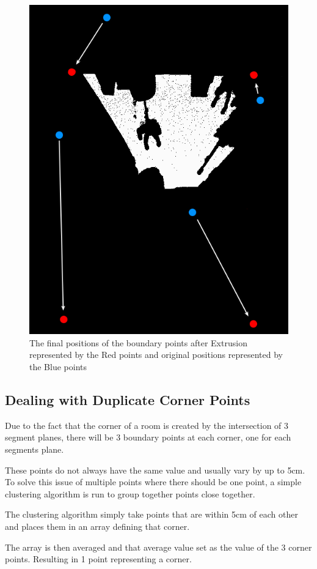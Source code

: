 			\begin{figure}[H]
				\centering
				\includegraphics[width=0.6\linewidth]{"Includes/images/Project Points/F-5"}
				\caption{The final positions of the boundary points after Extrusion represented by the Red points and original positions represented by the Blue points}
				\label{fig:F-5}
			\end{figure}
			
		\subsection{Dealing with Duplicate Corner Points}
			Due to the fact that the corner of a room is created by the intersection of 3 segment planes, there will be 3 boundary points at each corner, one for each segments plane.
			
			These points do not always have the same value and usually vary by up to 5cm. To solve this issue of multiple points where there should be one point, a simple clustering algorithm is run to group together points close together.
			
			The clustering algorithm simply take points that are within 5cm of each other and places them in an array defining that corner.
			
			The array is then averaged and that average value set as the value of the 3 corner points. Resulting in 1 point representing a corner.
			
